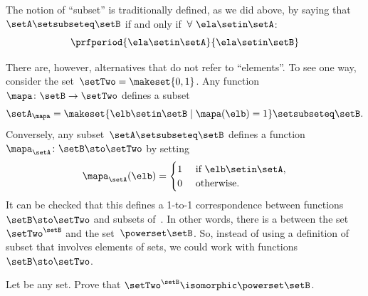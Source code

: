 \begin{example}
    The notion of ``subset'' is traditionally defined, as we did above, by saying that~$\setA \setsubseteq \setB$ if and only if~$\forall \ \ela \setin\setA$:
    \begin{equation}
        \prfperiod{
            \ela \setin\setA
        }{
            \ela \setin\setB
        }
    \end{equation}

    There are, however, alternatives that do not refer to ``elements''.
    To see one way, consider the set~$\setTwo = \makeset{ 0, 1}$.
    Any function~$\mapa \colon \setB \to \setTwo$ defines a subset
    \begin{equation}
        \setA_\mapa = \makeset{ \elb \setin\setB \mid \mapa(\elb) = 1 } \setsubseteq \setB.
    \end{equation}
    Conversely, any subset~$\setA \setsubseteq \setB$ defines a function~$\mapa_\setA \colon \setB \sto \setTwo$ by setting
    \begin{equation}
        \mapa_\setA(\elb) = \begin{cases}
            1 & \text{ if } \elb\setin\setA, \\
            0 & \text{ otherwise}.
        \end{cases}
    \end{equation}
    It can be checked that this defines a 1-to-1 correspondence between functions~$\setB \sto \setTwo$ and subsets of~\setB.
    In other words, there is a  between the set~$\setTwo^\setB$ and the set~$\powerset \setB$.
    So, instead of using a definition of subset that involves elements of sets, we could work with functions~$\setB \sto \setTwo$.
\end{example}

\begin{gradedexercise}
    \label{ex:SubsetsAsFunctions}
    Let \setB be any set.
    Prove that $\setTwo^\setB \isomorphic \powerset \setB$.
\end{gradedexercise}



